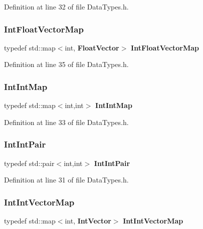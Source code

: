 Definition at line 32 of file Data\+Types.\+h.

\mbox{\label{_data_types_8h_ae9ec0f616e5edddb88bd7cba63e2ea88}} 
\subsubsection{Int\+Float\+Vector\+Map}
{\footnotesize\ttfamily typedef std\+::map$<$int,\textbf{ Float\+Vector}$>$ \textbf{ Int\+Float\+Vector\+Map}}



Definition at line 35 of file Data\+Types.\+h.

\mbox{\label{_data_types_8h_a1972afbb2da11833cc5c4e7dda7936cf}} 
\subsubsection{Int\+Int\+Map}
{\footnotesize\ttfamily typedef std\+::map$<$int,int$>$ \textbf{ Int\+Int\+Map}}



Definition at line 33 of file Data\+Types.\+h.

\mbox{\label{_data_types_8h_aafe152bbcb51930b658b8a4406f4d67e}} 
\subsubsection{Int\+Int\+Pair}
{\footnotesize\ttfamily typedef std\+::pair$<$int,int$>$ \textbf{ Int\+Int\+Pair}}



Definition at line 31 of file Data\+Types.\+h.

\mbox{\label{_data_types_8h_afae9076c89b4ed1654b0f85beb47af82}} 
\subsubsection{Int\+Int\+Vector\+Map}
{\footnotesize\ttfamily typedef std\+::map$<$int,\textbf{ Int\+Vector}$>$ \textbf{ Int\+Int\+Vector\+Map}}



